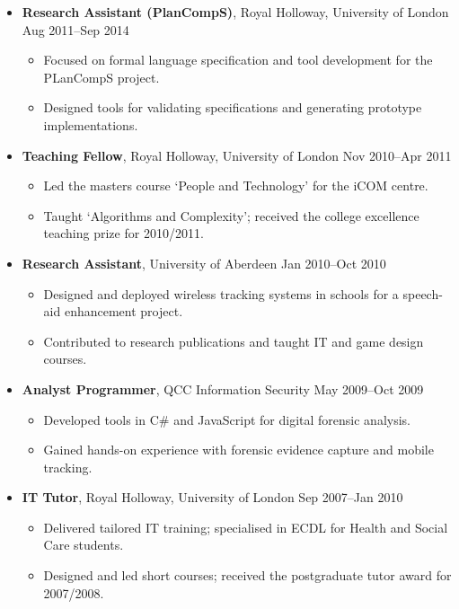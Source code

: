 \begin{itemize}
  \item \textbf{Research Assistant (PlanCompS)}, Royal Holloway, University of London \hfill Aug 2011--Sep 2014
  \begin{itemize}
    \item Focused on formal language specification and tool development for the PLanCompS project.
    \item Designed tools for validating specifications and generating prototype implementations.
  \end{itemize}

  \item \textbf{Teaching Fellow}, Royal Holloway, University of London \hfill Nov 2010--Apr 2011
  \begin{itemize}
    \item Led the masters course ‘People and Technology’ for the iCOM centre.
    \item Taught ‘Algorithms and Complexity’; received the college excellence teaching prize for 2010/2011. 
  \end{itemize}

  \item \textbf{Research Assistant}, University of Aberdeen \hfill Jan 2010--Oct 2010
  \begin{itemize}
    \item Designed and deployed wireless tracking systems in schools for a speech-aid enhancement project.
    \item Contributed to research publications and taught IT and game design courses.
  \end{itemize}

  \item \textbf{Analyst Programmer}, QCC Information Security \hfill May 2009--Oct 2009
  \begin{itemize}
    \item Developed tools in C# and JavaScript for digital forensic analysis.
    \item Gained hands-on experience with forensic evidence capture and mobile tracking.
  \end{itemize}

  \item \textbf{IT Tutor}, Royal Holloway, University of London \hfill Sep 2007--Jan 2010
  \begin{itemize}
    \item Delivered tailored IT training; specialised in ECDL for Health and Social Care students.
    \item Designed and led short courses; received the postgraduate tutor award for 2007/2008.
  \end{itemize}
\end{itemize}

